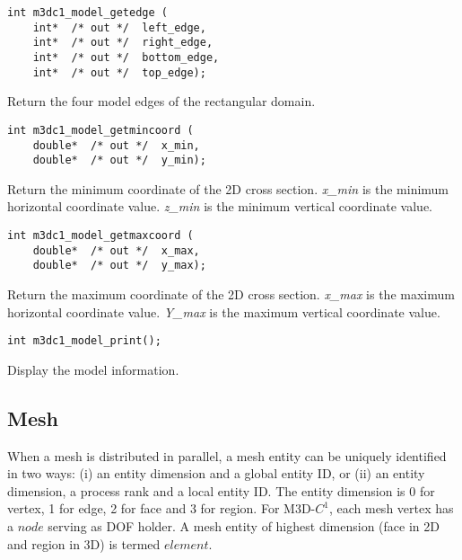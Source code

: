 \begin{verbatim}
int m3dc1_model_getedge (
    int*  /* out */  left_edge, 
    int*  /* out */  right_edge,
    int*  /* out */  bottom_edge, 
    int*  /* out */  top_edge); 
\end{verbatim}\vspace{-.5cm}\hspace{1cm}
Return the four model edges of the rectangular domain.

\begin{verbatim}
int m3dc1_model_getmincoord (
    double*  /* out */  x_min, 
    double*  /* out */  y_min);
\end{verbatim}\vspace{-.5cm}\hspace{1cm}
Return the minimum coordinate of the 2D cross section.
	      \textit{x\_min} is the minimum horizontal coordinate value. 
	      \textit{z\_min} is the minimum vertical coordinate value.

\begin{verbatim}
int m3dc1_model_getmaxcoord (
    double*  /* out */  x_max, 
    double*  /* out */  y_max);
\end{verbatim}\vspace{-.5cm}\hspace{1cm}
Return the maximum coordinate of the 2D  cross section. 
          \textit{x\_max} is the maximum horizontal coordinate value. 
          \textit{Y\_max} is the maximum vertical coordinate value.

\begin{verbatim}
int m3dc1_model_print();
\end{verbatim}\vspace{-.5cm}\hspace{1cm}
Display the model information.

\subsection{Mesh}
When a mesh is distributed in parallel, a mesh entity can be uniquely identified in two ways: (i) an entity dimension and a global entity ID, or (ii) an entity dimension, a process rank and a local entity ID. The entity dimension is 0 for vertex, 1 for edge, 2 for face and 3 for region. For M3D-$C^1$, each mesh vertex has a $node$ serving as DOF holder. A mesh entity of highest dimension (face in 2D and region in 3D) is termed $element$. 

